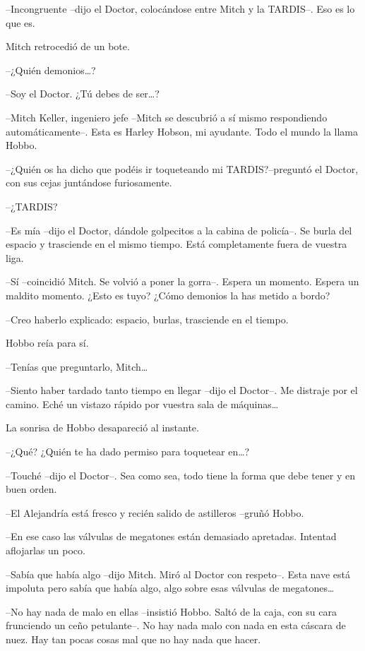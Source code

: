 {--Incongruente --dijo el Doctor, colocándose entre Mitch y la TARDIS--.
Eso es lo que es.}

{Mitch retrocedió de un bote.}

{--¿Quién demonios\ldots{}?}

{--Soy el Doctor. ¿Tú debes de ser\ldots{}?}

{--Mitch Keller, ingeniero jefe --Mitch se descubrió a sí mismo
 respondiendo automáticamente--. Esta es Harley Hobson, mi ayudante. Todo
el mundo la llama Hobbo.}

{--¿Quién os ha dicho que podéis ir toqueteando mi TARDIS?\@ --preguntó el
Doctor, con sus cejas juntándose furiosamente.}

{--¿TARDIS?}

{--Es mía --dijo el Doctor, dándole golpecitos a la cabina de policía--.
 Se burla del espacio y trasciende en el mismo tiempo. Está completamente
fuera de vuestra liga.}

{--Sí --coincidió Mitch. Se volvió a poner la gorra--. Espera un momento.
 Espera un maldito momento. ¿Esto es tuyo? ¿Cómo demonios la has metido a
bordo?}

{--Creo haberlo explicado: espacio, burlas, trasciende en el tiempo.}

{Hobbo reía para sí.}

{--Tenías que preguntarlo, Mitch\ldots{}}

{--Siento haber tardado tanto tiempo en llegar --dijo el Doctor--. Me
 distraje por el camino. Eché un vistazo rápido por vuestra sala de
 máquinas\ldots{}}

{La sonrisa de Hobbo desapareció al instante.}

{--¿Qué? ¿Quién te ha dado permiso para toquetear en\ldots{}?}

{--Touché --dijo el Doctor--. Sea como sea, todo tiene la forma que debe
tener y en buen orden.}

{--El Alejandría está fresco y recién salido de astilleros --gruñó
Hobbo.}

{--En ese caso las válvulas de megatones están demasiado apretadas.
Intentad aflojarlas un poco.}

{--Sabía que había algo --dijo Mitch. Miró al Doctor con respeto--. Esta
 nave está impoluta pero sabía que había algo, algo sobre esas válvulas
 de megatones\ldots{}}

{--No hay nada de malo en ellas --insistió Hobbo. Saltó de la caja, con
 su cara frunciendo un ceño petulante--. No hay nada malo con nada en
 esta cáscara de nuez. Hay tan pocas cosas mal que no hay nada que
hacer.}

